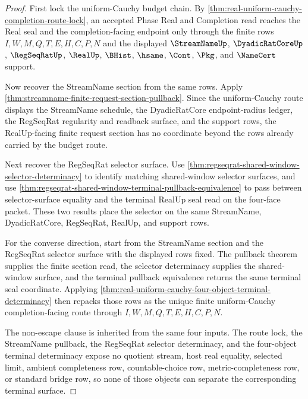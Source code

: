 \begin{proof}
First lock the uniform-Cauchy budget chain. By
\autoref{thm:real-uniform-cauchy-completion-route-lock}, an accepted Phase Real
and Completion read reaches the Real seal and the completion-facing endpoint
only through the finite rows $I,W,M,Q,T,E,H,C,P,N$ and the displayed
$\StreamNameUp$, $\DyadicRatCoreUp$, $\RegSeqRatUp$, $\RealUp$, $\BHist$,
$\hsame$, $\Cont$, $\Pkg$, and $\NameCert$ support.

Now recover the StreamName section from the same rows. Apply
\autoref{thm:streamname-finite-request-section-pullback}. Since the
uniform-Cauchy route displays the StreamName schedule, the DyadicRatCore
endpoint-radius ledger, the RegSeqRat regularity and readback surface, and the
support rows, the RealUp-facing finite request section has no coordinate beyond
the rows already carried by the budget route.

Next recover the RegSeqRat selector surface. Use
\autoref{thm:regseqrat-shared-window-selector-determinacy} to identify matching
shared-window selector surfaces, and use
\autoref{thm:regseqrat-shared-window-terminal-pullback-equivalence} to pass
between selector-surface equality and the terminal RealUp seal read on the
four-face packet. These two results place the selector on the same StreamName,
DyadicRatCore, RegSeqRat, RealUp, and support rows.

For the converse direction, start from the StreamName section and the RegSeqRat
selector surface with the displayed rows fixed. The pullback theorem supplies
the finite section read, the selector determinacy supplies the shared-window
surface, and the terminal pullback equivalence returns the same terminal seal
coordinate. Applying
\autoref{thm:real-uniform-cauchy-four-object-terminal-determinacy} then repacks
those rows as the unique finite uniform-Cauchy completion-facing route through
$I,W,M,Q,T,E,H,C,P,N$.

The non-escape clause is inherited from the same four inputs. The route lock,
the StreamName pullback, the RegSeqRat selector determinacy, and the four-object
terminal determinacy expose no quotient stream, host real equality, selected
limit, ambient completeness row, countable-choice row, metric-completeness row,
or standard bridge row, so none of those objects can separate the corresponding
terminal surface.
\end{proof}

